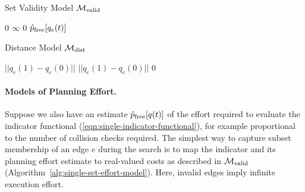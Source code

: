 \begin{genericfloat}
   {%
   \algrenewcommand\textproc{}%
   \begin{minipage}[t]{0.49\linewidth}%
      \vspace{-0.17in}%
      \begin{algorithm}[H]
         \caption{Set Validity Model
            $\mathcal{M}_{\mbox{\scriptsize valid}}$}
         \label{alg:single-set-effort-model}
         \begin{algorithmic}[1]
               \State \Return $0$
            \Else
               \State \Return $\infty$
            \EndIf
         \EndFunction
            \State \Return $0$
         \EndFunction
            \State \Return $\hat{p}_{\mbox{\scriptsize free}}[q_e(t)]$
         \EndFunction
         \end{algorithmic}
      \end{algorithm}
   \end{minipage}%
   \hspace{0.02\linewidth}%
   \begin{minipage}[t]{0.49\linewidth}%
      \vspace{-0.17in}%
      \begin{algorithm}[H]
         \caption{Distance Model
            $\mathcal{M}_{\mbox{\scriptsize dist}}$}
         \label{alg:dist-effort-model}
         \begin{algorithmic}[1]
            \State \Return $|| q_e(1) - q_e(0) ||$
         \EndFunction
            \State \Return $|| q_e(1) - q_e(0) ||$
         \EndFunction
            \State \Return $0$
         \EndFunction
         \end{algorithmic}
      \end{algorithm}
   \end{minipage}%
   }%
\end{genericfloat}

\paragraph{Models of Planning Effort.}
Suppose we also have an estimate $\hat{p}_{\mbox{\scriptsize free}}[q(t)]$
of the effort required to evaluate the indicator functional
(\ref{eqn:single-indicator-functional}),
for example proportional to the number of collision checks required.
The simplest way to capture subset membership of an edge $e$
during the search
is to map the indicator and its planning effort estimate
to real-valued costs as described in
$\mathcal{M}_{\mbox{\scriptsize valid}}$
(Algorithm~\ref{alg:single-set-effort-model}).
Here, invalid edges imply infinite execution effort.

